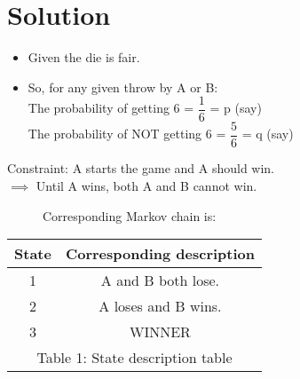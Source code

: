 \documentclass[journal,12pt,twocolumn]{IEEEtran}
\theoremstyle{definition}
\begin{document}
\section{\Large Solution}
\begin{itemize}
    \item Given the die is fair.
    \item So, for any given throw by A or B:\\
    The probability of getting 6 = $\dfrac{1}{6}$ = p (say)\\
    The probability of NOT getting 6 = $\dfrac{5}{6}$ = q (say)
\end{itemize}
Constraint: A starts the game and A should win.\\
$\implies$ Until A wins, both A and B cannot win.\\
\begin{figure}[!htb]
Corresponding Markov chain is:\\
\begin{center}
        \label{fig:Fig1}
\end{center}
\end{figure}
\begin{table}[!htb]
    \begin{center}
    \begin{tabular}{|c|c|}
        \hline
        State & Corresponding description \\
        \hline
        1 & A and B both lose.\\
        \hline
        2 & A loses and B wins.\\
        \hline
        3 & WINNER\\
        \hline
      \multicolumn{2}{c}{Table 1: State description table}
    \end{tabular}
    \end{center}
\end{table}
\end{document}
